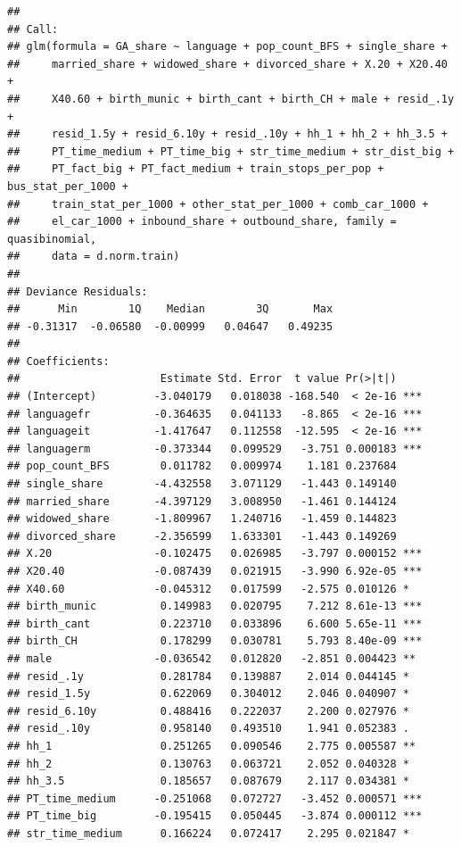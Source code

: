 \documentclass[
]{article}
\begin{document}
\begin{verbatim}
## 
## Call:
## glm(formula = GA_share ~ language + pop_count_BFS + single_share + 
##     married_share + widowed_share + divorced_share + X.20 + X20.40 + 
##     X40.60 + birth_munic + birth_cant + birth_CH + male + resid_.1y + 
##     resid_1.5y + resid_6.10y + resid_.10y + hh_1 + hh_2 + hh_3.5 + 
##     PT_time_medium + PT_time_big + str_time_medium + str_dist_big + 
##     PT_fact_big + PT_fact_medium + train_stops_per_pop + bus_stat_per_1000 + 
##     train_stat_per_1000 + other_stat_per_1000 + comb_car_1000 + 
##     el_car_1000 + inbound_share + outbound_share, family = quasibinomial, 
##     data = d.norm.train)
## 
## Deviance Residuals: 
##      Min        1Q    Median        3Q       Max  
## -0.31317  -0.06580  -0.00999   0.04647   0.49235  
## 
## Coefficients:
##                      Estimate Std. Error  t value Pr(>|t|)    
## (Intercept)         -3.040179   0.018038 -168.540  < 2e-16 ***
## languagefr          -0.364635   0.041133   -8.865  < 2e-16 ***
## languageit          -1.417647   0.112558  -12.595  < 2e-16 ***
## languagerm          -0.373344   0.099529   -3.751 0.000183 ***
## pop_count_BFS        0.011782   0.009974    1.181 0.237684    
## single_share        -4.432558   3.071129   -1.443 0.149140    
## married_share       -4.397129   3.008950   -1.461 0.144124    
## widowed_share       -1.809967   1.240716   -1.459 0.144823    
## divorced_share      -2.356599   1.633301   -1.443 0.149269    
## X.20                -0.102475   0.026985   -3.797 0.000152 ***
## X20.40              -0.087439   0.021915   -3.990 6.92e-05 ***
## X40.60              -0.045312   0.017599   -2.575 0.010126 *  
## birth_munic          0.149983   0.020795    7.212 8.61e-13 ***
## birth_cant           0.223710   0.033896    6.600 5.65e-11 ***
## birth_CH             0.178299   0.030781    5.793 8.40e-09 ***
## male                -0.036542   0.012820   -2.851 0.004423 ** 
## resid_.1y            0.281784   0.139887    2.014 0.044145 *  
## resid_1.5y           0.622069   0.304012    2.046 0.040907 *  
## resid_6.10y          0.488416   0.222037    2.200 0.027976 *  
## resid_.10y           0.958140   0.493510    1.941 0.052383 .  
## hh_1                 0.251265   0.090546    2.775 0.005587 ** 
## hh_2                 0.130763   0.063721    2.052 0.040328 *  
## hh_3.5               0.185657   0.087679    2.117 0.034381 *  
## PT_time_medium      -0.251068   0.072727   -3.452 0.000571 ***
## PT_time_big         -0.195415   0.050445   -3.874 0.000112 ***
## str_time_medium      0.166224   0.072417    2.295 0.021847 *  

\end{verbatim}
\end{document}

